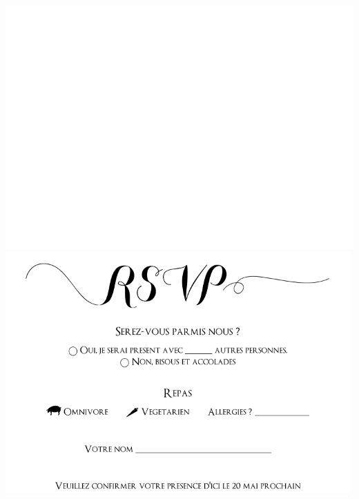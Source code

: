 \documentclass{letter}
\begin{document}
\includegraphics[page=2]{details.pdf} \\
\includegraphics[width=0.99\textwidth]{rsvp.pdf}
\end{document}
